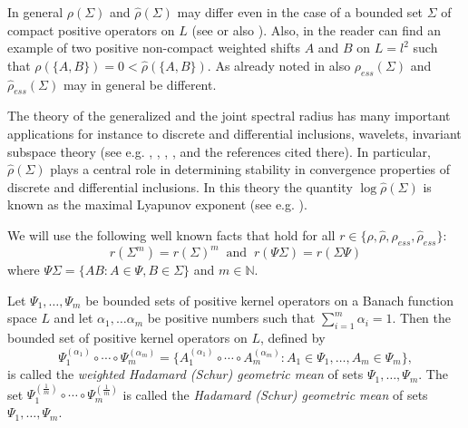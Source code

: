 \documentclass[12pt, reqno]{amsart}
\theoremstyle{definition}
\theoremstyle{remark}
\numberwithin{equation}{section}
\newcommand{\be}{\begin{equation}}
\newcommand{\ee}{\end{equation}}
\newcommand{\NN}{\mathbb{N}}
\begin{document}
In general $\rho (\Sigma)$ and $\hat{\rho}  (\Sigma)$ may differ even in the case of a bounded set $\Sigma$ of compact positive operators on $L$ (see \cite{SWP97} or also \cite{P17}).
Also, in \cite{Gui82} the reader can find an example of two positive non-compact weighted shifts $A$ and $B$ on $L=l^2$ such that $\rho(\{A,B\})=0 < \hat{\rho}(\{A,B\})$. As already noted in \cite{ShT00} also $\rho _{ess} (\Sigma)$ and $\hat{\rho} _{ess}  (\Sigma)$ may in general be different.

The theory of the generalized and the joint spectral radius has many important applications for instance to discrete and differential inclusions,
wavelets, invariant subspace theory
(see e.g. \cite{BW92}, \cite{Dai11}, \cite{Wi02}, \cite{ShT00}, \cite{ShT08} and the references cited there).
In particular, $\hat{\rho} (\Sigma)$ plays a central role in determining stability in convergence properties of discrete and differential inclusions. In this
theory the quantity $\log \hat{\rho} (\Sigma)$ is known as the maximal Lyapunov exponent (see e.g. \cite{Wi02}).

We will  use the following well known facts that hold for all $r \in \{\rho,  \hat{\rho}, \rho _{ess}, \hat{\rho} _{ess}  \}$:
\be
r (\Sigma  ^m) = r (\Sigma)^m \;\;\mathrm{and}\;\;
r (\Psi \Sigma) = r (\Sigma\Psi)
\label{again}
\ee
where $\Psi \Sigma =\{AB: A\in \Psi, B\in \Sigma\}$ and $m\in \NN$.

Let $\Psi _1, \ldots , \Psi _m$ be bounded sets of positive kernel operators on a Banach function space $L$ and let $\alpha _1, \ldots \alpha _m$ be positive numbers such that
$\sum _{i=1} ^m \alpha _i = 1$. Then the bounded set of positive kernel operators on $L$, defined by
$$\Psi _1 ^{( \alpha _1)} \circ \cdots \circ \Psi _m ^{(\alpha _m)}=\{ A_1 ^{( \alpha _1)} \circ \cdots \circ A _m ^{(\alpha _m)}: A_1\in \Psi _1, \ldots, A_m \in \Psi _m \},$$
is called the {\it weighted Hadamard (Schur) geometric mean} of sets $\Psi _1, \ldots , \Psi _m$. The set
$\Psi _1 ^{(\frac{1}{m})} \circ \cdots \circ \Psi _m ^{(\frac{1}{m})}$ is called the  {\it Hadamard (Schur) geometric mean} of sets $\Psi _1, \ldots , \Psi _m$.
\end{document}
